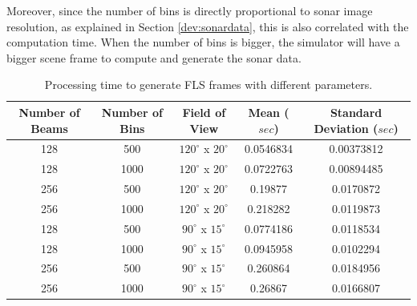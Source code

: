 \documentclass[final,5p,times]{elsarticle}
\begin{document}
Moreover, since the number of bins is directly proportional to sonar image resolution, as explained in Section \ref{dev:sonardata}, this is also correlated with the computation time. When the number of bins is bigger, the simulator will have a bigger scene frame to compute and generate the sonar data.

\begin{table}[htb]
    \caption{Processing time to generate FLS frames with different parameters.}
    \label{table:fls}
    \begin{center}
        \begin{tabular}{| c | c | c | c | c |}
            \hline
            Number of Beams & Number of Bins & Field of View & Mean ($sec$) & Standard Deviation ($sec$) \\
            \hline
            128     & 500       & $120^{\circ}$ x $20^{\circ}$        & 0.0546834   & 0.00373812  \\ \hline
            128     & 1000      & $120^{\circ}$ x $20^{\circ}$        & 0.0722763	& 0.00894485  \\ \hline
            256     & 500       & $120^{\circ}$ x $20^{\circ}$        & 0.19877	    & 0.0170872   \\ \hline
            256     & 1000      & $120^{\circ}$ x $20^{\circ}$        & 0.218282	& 0.0119873   \\ \hline
            128     & 500       & $90^{\circ}$ x $15^{\circ}$         & 0.0774186	& 0.0118534   \\ \hline
            128     & 1000      & $90^{\circ}$ x $15^{\circ}$         & 0.0945958	& 0.0102294   \\ \hline
            256     & 500       & $90^{\circ}$ x $15^{\circ}$         & 0.260864	& 0.0184956   \\ \hline
            256     & 1000      & $90^{\circ}$ x $15^{\circ}$         & 0.26867	    & 0.0166807   \\ \hline
        \end{tabular}
    \end{center}
\end{table}
\end{document}
